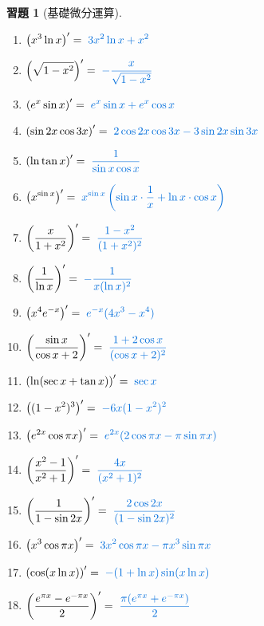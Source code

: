 \documentclass[12pt]{extarticle}
\newcommand{\ds}{\displaystyle}
\theoremstyle{definition}
\newtheorem*{exe}{習題}
\begin{document}
\begin{exe}[基礎微分運算]
\begin{multicols}{2}
\begin{enumerate}
      \item $\ds\left(x^3 \ln x\right)' = {\color{C2}\;3x^2 \ln x + x^2}$
      \item $\ds\left(\sqrt{1 - x^2}\right)' = {\color{C2}\;-\frac{x}{\sqrt{1 - x^2}}}$
      \item $\ds\left(e^x \sin x\right)' = {\color{C2}\;e^x \sin x + e^x \cos x}$
      \item $\ds\left(\sin2x\cos3x\right)' = {\color{C2}\;2\cos2x\cos3x - 3\sin2x\sin3x}$
      \item $\ds\left(\ln\tan x\right)' = {\color{C2}\;\frac{1}{\sin x\cos x}}$
      \item $\ds\left(x^{\sin x}\right)' = {\color{C2}\;x^{\sin x}\left(\sin x \cdot \frac{1}{x} + \ln x \cdot \cos x\right)}$
      \item $\ds\left(\frac{x}{1 + x^2}\right)' = {\color{C2}\;\frac{1 - x^2}{(1 + x^2)^2}}$
      \item $\ds\left(\frac{1}{\ln x}\right)' = {\color{C2}\;-\frac{1}{x(\ln x)^2}}$
      \item $\ds\left(x^4 e^{-x}\right)' = {\color{C2}\;e^{-x}(4x^3 - x^4)}$
      \item $\ds\left(\frac{\sin x}{\cos x + 2}\right)' = {\color{C2}\;\frac{1 + 2\cos x}{(\cos x + 2)^2}}$
      \item $\ds\left(\ln(\sec x + \tan x)\right)' = {\color{C2}\;\sec x}$
      \item $\ds\left((1 - x^2)^3\right)' = {\color{C2}\;-6x(1 - x^2)^2}$
      \item $\ds\left(e^{2x} \cos\pi x\right)' = {\color{C2}\;e^{2x}(2\cos\pi x - \pi\sin\pi x)}$
      \item $\ds\left(\frac{x^2 - 1}{x^2 + 1}\right)' = {\color{C2}\;\frac{4x}{(x^2 + 1)^2}}$
      \item $\ds\left(\frac{1}{1 - \sin 2x}\right)' = {\color{C2}\;\frac{2\cos 2x}{(1 - \sin 2x)^2}}$
      \item $\ds\left(x^3\cos\pi x\right)' = {\color{C2}\;3x^2\cos\pi x - \pi x^3\sin\pi x}$
      \item $\ds\left(\cos(x\ln x)\right)' = {\color{C2}\;-(1 + \ln x)\sin(x\ln x)}$
      \item $\ds\left(\frac{e^{\pi x} - e^{-\pi x}}{2}\right)' = {\color{C2}\;\frac{\pi(e^{\pi x} + e^{-\pi x})}{2}}$

\end{enumerate}
\end{multicols}
\end{exe}
\end{document}
